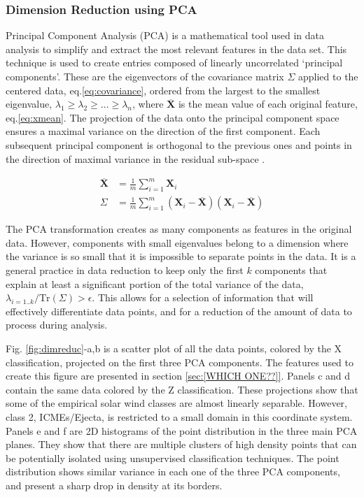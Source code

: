 \subsubsection{Dimension Reduction using PCA}
Principal Component Analysis (PCA) is a mathematical tool used in data analysis to simplify and extract the most relevant features in the data set. This technique is used to create entries composed of linearly uncorrelated `principal components'. These are the eigenvectors of the covariance matrix $\Sigma$ applied to the centered data, eq.\eqref{eq:covariance}, ordered from the largest to the smallest eigenvalue, $\lambda_1 \ge \lambda_2 \ge ... \ge \lambda_n$, where $\overline{\boldsymbol{X}}$ is the mean value of each original feature, eq.\eqref{eq:xmean}. The projection of the data onto the principal component space ensures a maximal variance on the direction of the first component. Each subsequent principal component is orthogonal to the previous ones and points in the direction of maximal variance in the residual sub-space \citep{Shlens2014}.

\begin{align}
\overline{\boldsymbol{X}} & = \frac{1}{m} \sum_{i=1}^{m} \boldsymbol{X}_i \label{eq:xmean} \\
\Sigma & = \frac{1}{m} \sum_{i=1}^{m} \left( \boldsymbol{X}_i - \overline{\boldsymbol{X}} \right)\left( \boldsymbol{X}_i - \overline{\boldsymbol{X}} \right) \label{eq:covariance}
\end{align}

The PCA transformation creates as many components as features in the original data. However, components with small eigenvalues belong to a dimension where the variance is so small that it is impossible to separate points in the data. It is a general practice in data reduction to keep only the first $k$ components that explain at least a significant portion of the total variance of the data, $\lambda_{i=1..k}/\text{Tr}(\Sigma) > \epsilon$. This allows for a selection of information that will effectively differentiate data points, and for a reduction of the amount of data to process during analysis.

Fig. \ref{fig:dimreduc}-a,b is a scatter plot of all the data points, colored by the X classification, projected on the first three PCA components. The features used to create this figure are presented in section \ref{sec:[WHICH ONE??]}. Panels c and d contain the same data colored by the Z classification. These projections show that some of the empirical solar wind classes are almost linearly separable. However, class 2, ICMEs/Ejecta, is restricted to a small domain in this coordinate system. Panels e and f are 2D histograms of the point distribution in the three main PCA planes. They show that there are multiple clusters of high density points that can be potentially isolated using unsupervised classification techniques. The point distribution shows similar variance in each one of the three PCA components, and present a sharp drop in density at its borders.

